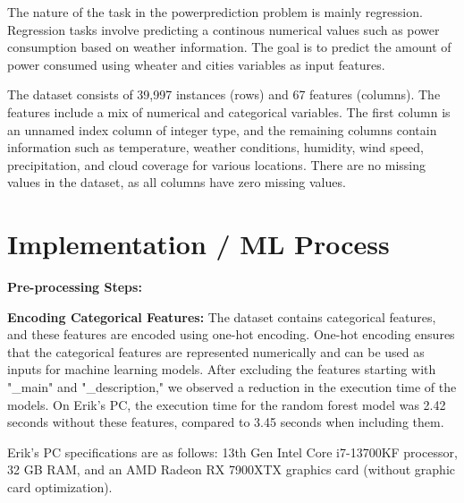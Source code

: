 \documentclass[a4, 10 pt, conference]{ieeeconf}  %
\begin{document}
The nature of the task in the powerprediction problem is mainly regression. Regression tasks involve predicting a continous numerical values such as power consumption based on weather information. The goal is to predict the amount of power consumed using wheater and cities variables as input features.

The dataset consists of 39,997 instances (rows) and 67 features (columns). The features include a mix of numerical and categorical variables. The first column is an unnamed index column of integer type, and the remaining columns contain information such as temperature, weather conditions, humidity, wind speed, precipitation, and cloud coverage for various locations. There are no missing values in the dataset, as all columns have zero missing values.









\section{Implementation / ML Process}
\label{sec:methods}


\textbf{Pre-processing Steps:}

\textbf{Encoding Categorical Features:} The dataset contains categorical features, and these features are encoded using one-hot encoding. One-hot encoding ensures that the categorical features are represented numerically and can be used as inputs for machine learning models.
After excluding the features starting with "\_main" and "\_description," we observed a reduction in the execution time of the models. On Erik's PC, the execution time for the random forest model was 2.42 seconds without these features, compared to 3.45 seconds when including them.

Erik's PC specifications are as follows: 13th Gen Intel Core i7-13700KF processor, 32 GB RAM, and an AMD Radeon RX 7900XTX graphics card (without graphic card optimization).
\end{document}
